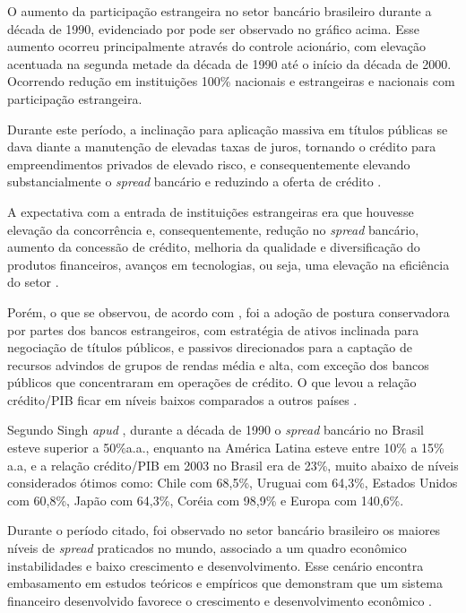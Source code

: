 \documentclass[12pt,openright,oneside,a4paper,chapter=TITLE,section=TITLE,subsection=Title,english,french,spanish,portugues,sumario=tradicional]{04-class-files/abntex2}
\begin{document}
\label{fig: ev.capital}

O aumento da participação estrangeira no setor bancário brasileiro durante a década de 1990, evidenciado por \textcite{camargo:2009} pode ser observado no gráfico acima. Esse aumento ocorreu principalmente através do controle acionário, com elevação acentuada na segunda metade da década de 1990 até o início da década de 2000. Ocorrendo redução em instituições 100\% nacionais e estrangeiras e nacionais com participação estrangeira.

Durante este período, a inclinação para aplicação massiva em títulos públicas se dava diante a manutenção de elevadas taxas de juros, tornando o crédito para empreendimentos privados de elevado risco, e consequentemente elevando substancialmente o \emph{spread} bancário e reduzindo a oferta de crédito \cite{camargo:2009}.

A expectativa com a entrada de instituições estrangeiras era que houvesse elevação da concorrência e, consequentemente, redução no \emph{spread} bancário, aumento da concessão de crédito, melhoria da qualidade e diversificação do produtos financeiros, avanços em tecnologias, ou seja, uma elevação na eficiência do setor \cite{camargo:2009}.

Porém, o que se observou, de acordo com \textcite{camargo:2009}, foi a adoção de postura conservadora por partes dos bancos estrangeiros, com estratégia de ativos inclinada para negociação de títulos públicos, e passivos direcionados para a captação de recursos advindos de grupos de rendas média e alta, com exceção dos bancos públicos que concentraram em operações de crédito. O que levou a relação crédito/PIB ficar em níveis baixos comparados a outros países \cite{camargo:2009, leal:2006}.

Segundo Singh \emph{apud} \textcite{leal:2006}, durante a década de 1990 o \emph{spread} bancário no Brasil esteve superior a 50\%a.a., enquanto na América Latina esteve entre 10\% a 15\% a.a, e a relação crédito/PIB em 2003 no Brasil era de 23\%, muito abaixo de níveis considerados ótimos como: Chile com 68,5\%, Uruguai com 64,3\%, Estados Unidos com 60,8\%, Japão com 64,3\%, Coréia com 98,9\% e Europa com 140,6\%.

Durante o período citado, foi observado no setor bancário brasileiro os maiores níveis de \emph{spread} praticados no mundo, associado a um quadro econômico instabilidades e baixo crescimento e desenvolvimento. Esse cenário encontra embasamento em estudos teóricos e empíricos que demonstram que um sistema financeiro desenvolvido favorece o crescimento e desenvolvimento econômico \cite{levine:1997, matos:2003}.
\end{document}
